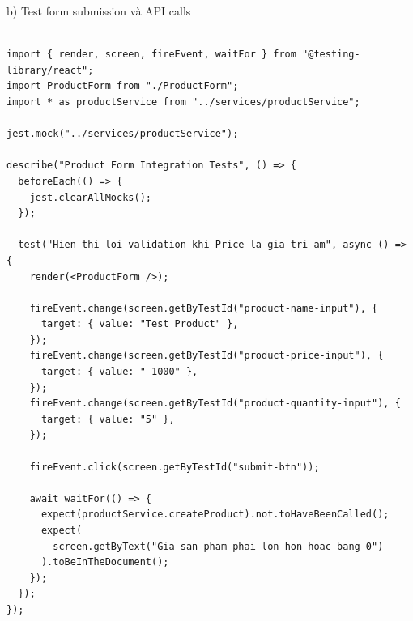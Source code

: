 \documentclass[a4paper,12pt]{article}
\begin{document}
b) Test form submission và API calls
\begin{tcolorbox}[breakable, colback=green!5,colframe=black!50,title=Product Form Integration Tests]
\begin{lstlisting}

import { render, screen, fireEvent, waitFor } from "@testing-library/react";
import ProductForm from "./ProductForm";
import * as productService from "../services/productService";

jest.mock("../services/productService");

describe("Product Form Integration Tests", () => {
  beforeEach(() => {
    jest.clearAllMocks();
  });

  test("Hien thi loi validation khi Price la gia tri am", async () => {
    render(<ProductForm />);

    fireEvent.change(screen.getByTestId("product-name-input"), {
      target: { value: "Test Product" },
    });
    fireEvent.change(screen.getByTestId("product-price-input"), {
      target: { value: "-1000" },
    });
    fireEvent.change(screen.getByTestId("product-quantity-input"), {
      target: { value: "5" },
    });

    fireEvent.click(screen.getByTestId("submit-btn"));

    await waitFor(() => {
      expect(productService.createProduct).not.toHaveBeenCalled();
      expect(
        screen.getByText("Gia san pham phai lon hon hoac bang 0")
      ).toBeInTheDocument();
    });
  });
});

\end{lstlisting}
\end{tcolorbox}
\end{document}
